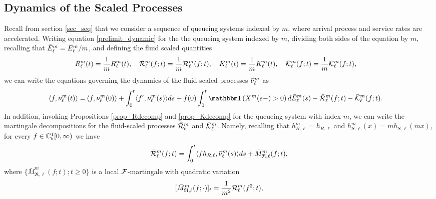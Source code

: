 \documentclass{article}
\theoremstyle{definition}
\numberwithin{equation}{section}
\begin{document}
\subsection{Dynamics of the Scaled Processes}\label{sec_mDynamic}
Recall from section \ref{sec_seq} that we consider a sequence of queueing systems indexed by $m$, where arrival process and service rates are accelerated. Writing equation  \eqref{prelimit_dynamic} for the the queueing system indexed by $m$, dividing both sides of the equation by $m$, recalling that $\bar E_\ell^m =E_\ell^m/m$, and defining the fluid scaled quantities
\begin{equation}\label{def_fluid}
  \bar{R}_\ell^m(t)=\frac{1}{m}R_\ell^m(t),\quad
  \bar{\mathcal{R}}_\ell^m(f;t)=\frac{1}{m}\mathcal{R}_\ell^m(f;t),\quad \bar{K}_\ell^m(t)=\frac{1}{m}K_\ell^m(t),\quad \bar{\mathcal{K}}_\ell^m(f;t)=\frac{1}{m}\mathcal{K}_\ell^m(f;t),\quad
\end{equation}
we can write the equations governing the dynamics of the fluid-scaled processes $\bar{\nu}_\ell^m$ as
\begin{align}\label{prelimit_dynamic_scaled}
  \pairil{f}{\bnu^m_\ell(t)}= & \pair{f}{\bnu^m_\ell(0)}+ \int_{0}^{t}\pairil{f'}{\bnu^m_\ell(s)}ds+   f(0)\int_0^t\indic{X^m(s-)>0}d\barrival^m_{\ell}(s)  -\bar\renegC^m_\ell(f;t)-\bar\entryC^m_\ell(f;t).
\end{align}
In addition, invoking Propositions \ref{prop_Rdecomp} and \ref{prop_Kdecomp} for the queueing system with index $m$, we can write the martingale decompositions for the fluid-scaled processes $\bar{\mathcal{R}}_\ell^m$ and $\bar{\mathcal{K}}_\ell^m$. Namely, recalling that $h^m_{R,\ell}=h_{R,\ell}$ and $h^m_{S,\ell}(x)=mh_{S,\ell}(mx)$, for every $f\in\mathbb{C}_b^{1}[0,\infty)$ we have
\begin{equation}\label{Rdecomp_scaled}
    \bar{\mathcal{R}}^m_\ell(f;t)= \int_0^t \langle fh_{R,\ell},\bar{\nu}^m_\ell(s)\rangle ds +\bar M^m_{\mathfrak{R},\ell}(f;t),
\end{equation}
where $\{\bar M^m_{\mathfrak{R},\ell}(f;t);t\geq0\}$ is a local $\mathcal{F}$-martingale with quadratic variation
\begin{equation}\label{MR_QV}
  [\bar M^m_{\mathfrak{R},\ell}(f;\cdot)]_t =\frac{1}{m^2}\mathcal{R}^m_\ell(f^2;t),
\end{equation}
\end{document}
